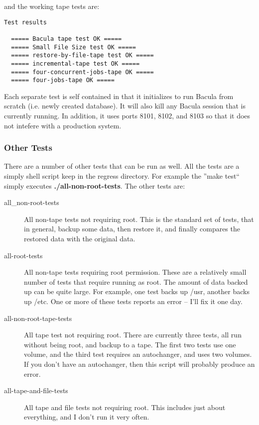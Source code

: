 and the working tape tests are: 

\footnotesize
\begin{verbatim}
Test results
  
  ===== Bacula tape test OK =====
  ===== Small File Size test OK =====
  ===== restore-by-file-tape test OK =====
  ===== incremental-tape test OK =====
  ===== four-concurrent-jobs-tape OK =====
  ===== four-jobs-tape OK =====
\end{verbatim}
\normalsize

Each separate test is self contained in that it initializes to run Bacula from
scratch (i.e. newly created database). It will also kill any Bacula session
that is currently running. In addition, it uses ports 8101, 8102, and 8103 so
that it does not intefere with a production system. 

\subsubsection*{Other Tests}

There are a number of other tests that can be run as well. All the tests are a
simply shell script keep in the regress directory. For example the ''make
test`` simply executes {\bf ./all-non-root-tests}. The other tests are: 

\begin{description}

\item [all\_non-root-tests]
   All non-tape tests not requiring root.  This is the standard set of tests,
that in general, backup some  data, then restore it, and finally compares the
restored data  with the original data.  

\item [all-root-tests]
   All non-tape tests requiring root permission.  These are a relatively small
number of tests that require running  as root. The amount of data backed up
can be quite large. For  example, one test backs up /usr, another backs up
/etc. One  or more of these tests reports an error -- I'll fix it one  day. 

\item [all-non-root-tape-tests]
   All tape test not requiring root.  There are currently three tests, all run
without being root,  and backup to a tape. The first two tests use one volume,
and the third test requires an autochanger, and uses two  volumes. If you
don't have an autochanger, then this script  will probably produce an error. 

\item [all-tape-and-file-tests]
   All tape and file tests not requiring  root. This includes just about
everything, and I don't run it  very often. 
\end{description}

